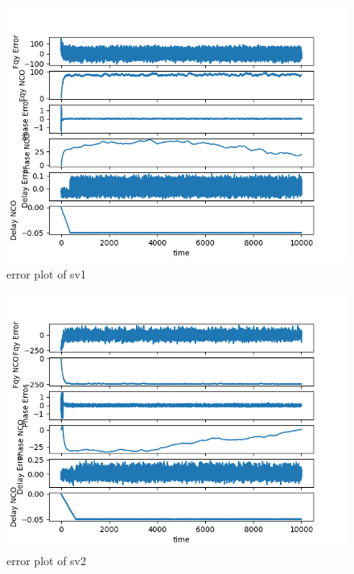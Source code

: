 \begin{figure}[ht]
\centering
\includegraphics[width=1\textwidth]{figs/sv1_trkng.png}
\centering
\captionsetup{justification=centering}
\caption{error plot of sv1}
\end{figure}

\begin{figure}[ht]
\centering
\includegraphics[width=1\textwidth]{figs/sv2_trkng.png}
\centering
\captionsetup{justification=centering}
\caption{error plot of sv2}
\end{figure}

